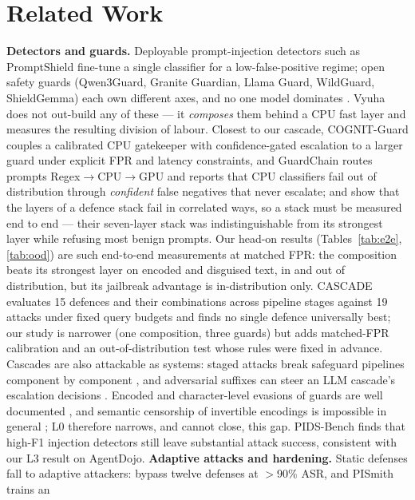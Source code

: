 \documentclass[11pt]{article}
\begin{document}
\section{Related Work}
\textbf{Detectors and guards.} Deployable prompt-injection detectors such as PromptShield
\citep{promptshield} fine-tune a single classifier for a low-false-positive regime; open safety guards
(Qwen3Guard, Granite Guardian, Llama Guard, WildGuard, ShieldGemma) each own different axes, and no one
model dominates \citep{guard-bench}. Vyuha does not out-build any of these --- it \emph{composes} them
behind a CPU fast layer and measures the resulting division of labour. Closest to our cascade,
COGNIT-Guard \citep{cognit} couples a calibrated CPU gatekeeper with confidence-gated escalation to a
larger guard under explicit FPR and latency constraints, and
GuardChain \citep{guardchain} routes prompts Regex$\rightarrow$CPU$\rightarrow$GPU and reports that CPU
classifiers fail out of distribution through \emph{confident} false negatives that never escalate; and
\citet{layered-ensemble} show that the layers of a defence stack fail in correlated ways, so a stack must
be measured end to end --- their seven-layer stack was indistinguishable from its strongest layer while
refusing most benign prompts. Our head-on results (Tables~\ref{tab:e2e}, \ref{tab:ood}) are such end-to-end measurements at matched
FPR: the composition beats its strongest layer on encoded and disguised text, in and out of
distribution, but its jailbreak advantage is in-distribution only.
CASCADE \citep{cascade-eval} evaluates 15 defences and their combinations across pipeline stages against 19
attacks under fixed query budgets and finds no single defence universally best; our study is narrower
(one composition, three guards) but adds matched-FPR calibration and an out-of-distribution test whose rules were fixed in advance.
Cascades are also attackable as systems: staged attacks break safeguard pipelines component by component
\citep{stack}, and adversarial suffixes can steer an LLM cascade's escalation decisions \citep{cascade-attack}.
Encoded and character-level evasions of guards are well documented \citep{hackett,emoji}, and semantic
censorship of invertible encodings is impossible in general \citep{glukhov}; L0 therefore narrows, and
cannot close, this gap. PIDS-Bench \citep{pidsbench} finds that high-F1 injection detectors still leave
substantial attack success, consistent with our L3 result on AgentDojo.
\textbf{Adaptive attacks and hardening.} Static defenses fall to adaptive attackers:
\citet{attacker-second} bypass twelve defenses at $>$90\% ASR, and PISmith \citep{pismith} trains an
\end{document}
